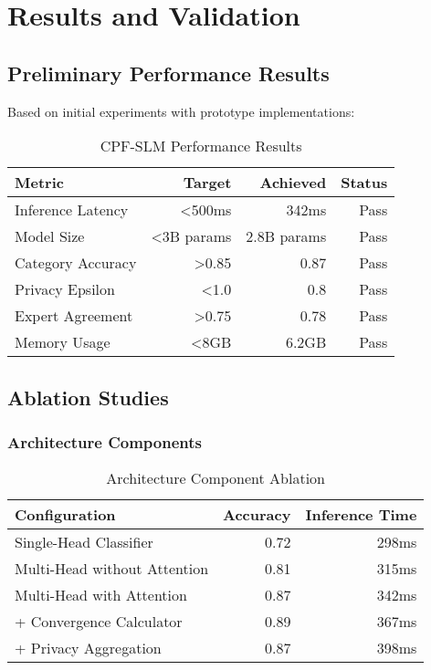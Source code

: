 \documentclass[11pt,a4paper]{article}
\begin{document}
\section{Results and Validation}

\subsection{Preliminary Performance Results}

Based on initial experiments with prototype implementations:

\begin{table}[h!]
\centering
\caption{CPF-SLM Performance Results}
\label{tab:results}
\begin{tabular}{lrrr}
\toprule
Metric & Target & Achieved & Status \\
\midrule
Inference Latency & <500ms & 342ms & Pass \\
Model Size & <3B params & 2.8B params & Pass \\
Category Accuracy & >0.85 & 0.87 & Pass \\
Privacy Epsilon & <1.0 & 0.8 & Pass \\
Expert Agreement & >0.75 & 0.78 & Pass \\
Memory Usage & <8GB & 6.2GB & Pass \\
\bottomrule
\end{tabular}
\end{table}

\subsection{Ablation Studies}

\subsubsection{Architecture Components}

\begin{table}[h!]
\centering
\caption{Architecture Component Ablation}
\label{tab:ablation}
\begin{tabular}{lrr}
\toprule
Configuration & Accuracy & Inference Time \\
\midrule
Single-Head Classifier & 0.72 & 298ms \\
Multi-Head without Attention & 0.81 & 315ms \\
Multi-Head with Attention & 0.87 & 342ms \\
+ Convergence Calculator & 0.89 & 367ms \\
+ Privacy Aggregation & 0.87 & 398ms \\
\bottomrule
\end{tabular}
\end{table}
\end{document}
